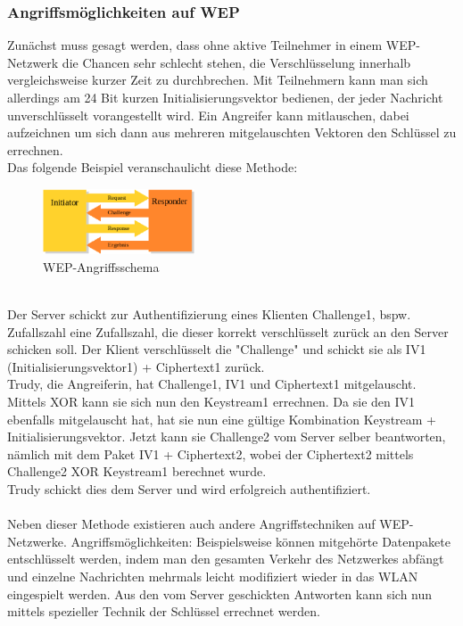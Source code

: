 \documentclass[a4paper,13pt]{scrartcl}
\begin{document}
\subsubsection{Angriffsmöglichkeiten auf WEP}
Zunächst muss gesagt werden, dass ohne aktive Teilnehmer in einem WEP-Netzwerk die Chancen sehr schlecht stehen, die Verschlüsselung innerhalb vergleichsweise kurzer Zeit zu durchbrechen. Mit Teilnehmern kann man sich allerdings am 24 Bit kurzen Initialisierungsvektor bedienen, der jeder Nachricht unverschlüsselt vorangestellt wird. Ein Angreifer kann mitlauschen, dabei aufzeichnen um sich dann aus mehreren mitgelauschten Vektoren den Schlüssel zu errechnen.\\
Das folgende Beispiel veranschaulicht diese Methode:
\begin{figure}[ht]
		\centering
	\includegraphics[width=0.4\textwidth]{WEP_Angriff.eps}
		\caption{WEP-Angriffsschema}
		\label{fig3}
\end{figure}\\
Der Server schickt zur Authentifizierung eines Klienten Challenge1, bspw. Zufallszahl eine Zufallszahl, die dieser korrekt verschlüsselt zurück an den Server schicken soll. Der Klient verschlüsselt die "Challenge" und schickt sie als IV1 (Initialisierungsvektor1) + Ciphertext1 zurück.\\
Trudy, die Angreiferin, hat Challenge1, IV1 und Ciphertext1 mitgelauscht.
Mittels XOR kann sie sich nun den Keystream1 errechnen. Da sie den IV1 ebenfalls mitgelauscht hat, hat sie nun eine gültige Kombination Keystream + Initialisierungsvektor. Jetzt kann sie Challenge2 vom Server selber beantworten, nämlich mit dem Paket IV1 + Ciphertext2, wobei der Ciphertext2 mittels Challenge2 XOR Keystream1 berechnet wurde.\\
Trudy schickt dies dem Server und wird erfolgreich authentifiziert.\\
\\
Neben dieser Methode existieren auch andere Angriffstechniken auf WEP-Netzwerke. Angriffsmöglichkeiten: Beispielsweise können mitgehörte Datenpakete entschlüsselt werden, indem man den gesamten Verkehr des Netzwerkes abfängt und einzelne Nachrichten mehrmals leicht modifiziert wieder in das WLAN eingespielt werden. Aus den vom Server geschickten Antworten kann sich nun mittels spezieller Technik der Schlüssel errechnet werden.\\
\end{document}
